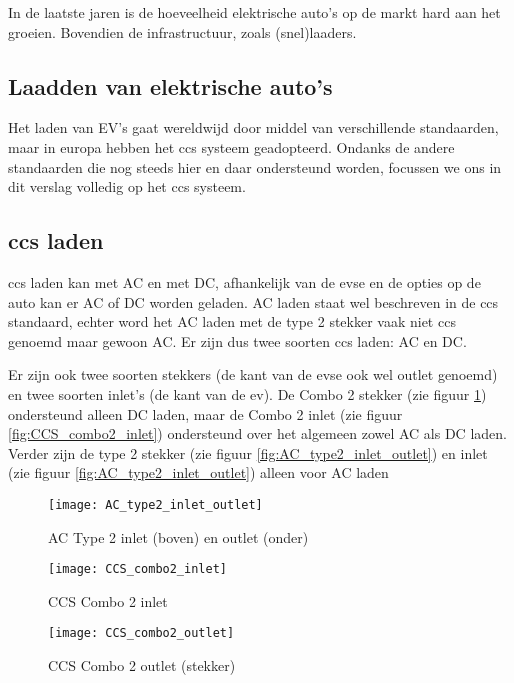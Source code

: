 In de laatste jaren is de hoeveelheid elektrische auto's op de markt hard aan
het groeien. Bovendien de infrastructuur, zoals (snel)laaders. 

\subsection{Laadden van elektrische auto's}

Het laden van EV's gaat wereldwijd door middel van verschillende standaarden,
maar in europa hebben het \ac{ccs} systeem geadopteerd. Ondanks de andere
standaarden die nog steeds hier en daar ondersteund worden, focussen we ons in
dit verslag volledig op het \ac{ccs} systeem.

\subsection{\ac{ccs} laden}

\ac{ccs} laden kan met AC en met DC, afhankelijk van de \ac{evse} en de opties
op de auto kan er AC of DC worden geladen. AC laden staat wel beschreven in de
\ac{ccs} standaard, echter word het AC laden met de type 2 stekker vaak niet
\ac{ccs} genoemd maar gewoon AC. Er zijn dus twee soorten \ac{ccs} laden: AC en
DC.

Er zijn ook twee soorten stekkers (de kant van de \ac{evse} ook wel outlet
genoemd) en twee soorten inlet's (de kant van de \ac{ev}). De Combo 2 stekker
(zie figuur \ref{fig:CCS_combo2_outlet}) ondersteund alleen DC laden, maar de
Combo 2 inlet (zie figuur \ref{fig:CCS_combo2_inlet}) ondersteund over het
algemeen zowel AC als DC laden. Verder zijn de type 2 stekker (zie figuur
\ref{fig:AC_type2_inlet_outlet}) en inlet (zie figuur
\ref{fig:AC_type2_inlet_outlet}) alleen voor AC laden

\begin{figure}[h]
    \centering
    \begin{minipage}{0.45\textwidth}
        \centerline{\texttt{[image: AC\_type2\_inlet\_outlet]}}
        \caption{AC Type 2 inlet (boven) en outlet (onder)}
        \label{fig:AC_type2_inlet_outlet}
    \end{minipage}\hfill
    \begin{minipage}{0.45\textwidth}
        \centerline{\texttt{[image: CCS\_combo2\_inlet]}}
        \caption{CCS Combo 2 inlet}
        \label{fig:CCS_combo2_inlet}
        \hfill
        \centerline{\texttt{[image: CCS\_combo2\_outlet]}}
        \caption{CCS Combo 2 outlet (stekker)}
        \label{fig:CCS_combo2_outlet}
    \end{minipage}
\end{figure}

